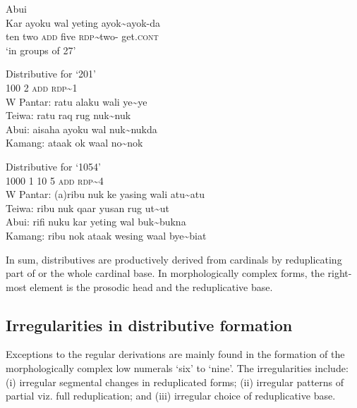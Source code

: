 \ea%
\label{bkm:Ref342661452}
  Abui\\
\gll Kar   ayoku   wal   yeting   ayok\~{}ayok-da\\
   ten   two   \textsc{add}   five   \textsc{rdp}\textit{\~{}}two-\textsc{} get.\textsc{cont} \\
\glt  `in groups of 27'
\z



\ea%
\label{bkm:Ref342656299}
 Distributive for `201' \\
\glllll  {} 100    2    \textsc{add}    \textsc{rdp}\~{}1\\
 {W Pantar:} ratu    alaku    wali     ye\~{}ye        \\
 Teiwa:    ratu    raq    rug    nuk\~{}nuk      \\
 Abui:     aisaha     ayoku    wal    nuk\~{}nukda      \\
 Kamang:   ataak     ok     waal    no\~{}nok     \\
\z









\ea%
\label{bkm:Ref342744393}
 Distributive for `1054'\\
\glllll   {}   1000    1  10  5    \textsc{add}  \textsc{rdp}\~{}4 \\
   {W Pantar:}  (a)ribu   nuk   ke  yasing     wali  atu\~{}atu    \\
   Teiwa:    ribu     nuk  qaar  yusan    rug  ut\~{}ut    \\
   Abui:     rifi    nuku  kar  yeting    wal  buk\~{}bukna      \\
   Kamang:   ribu    nok  ataak  wesing    waal  bye\~{}biat     \\
\z


In sum, distributives are productively derived from cardinals by reduplicating part of or the whole cardinal base. In morphologically complex forms, the right-most element is the prosodic head and the reduplicative base.

\subsection{Irregularities in distributive formation}
Exceptions to the regular derivations are mainly found in the formation of the morphologically complex low numerals `six' to `nine'. The irregularities include: (i) irregular segmental changes in reduplicated forms; (ii) irregular patterns of partial viz. full reduplication; and (iii) irregular choice of reduplicative base.


